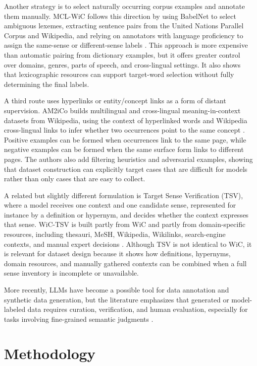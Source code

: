 \documentclass[10pt,a4paper,twocolumn]{article}
\begin{document}
Another strategy is to select naturally occurring corpus examples and annotate them manually. MCL-WiC follows this direction by using BabelNet to select ambiguous lexemes, extracting sentence pairs from the United Nations Parallel Corpus and Wikipedia, and relying on annotators with language proficiency to assign the same-sense or different-sense labels \citep{martelli2021mclwic}. This approach is more expensive than automatic pairing from dictionary examples, but it offers greater control over domains, genres, parts of speech, and cross-lingual settings. It also shows that lexicographic resources can support target-word selection without fully determining the final labels.

A third route uses hyperlinks or entity/concept links as a form of distant supervision. AM2iCo builds multilingual and cross-lingual meaning-in-context datasets from Wikipedia, using the context of hyperlinked words and Wikipedia cross-lingual links to infer whether two occurrences point to the same concept \citep{liu2021am2ico}. Positive examples can be formed when occurrences link to the same page, while negative examples can be formed when the same surface form links to different pages. The authors also add filtering heuristics and adversarial examples, showing that dataset construction can explicitly target cases that are difficult for models rather than only cases that are easy to collect.

A related but slightly different formulation is Target Sense Verification (TSV), where a model receives one context and one candidate sense, represented for instance by a definition or hypernym, and decides whether the context expresses that sense. WiC-TSV is built partly from WiC and partly from domain-specific resources, including thesauri, MeSH, Wikipedia, Wikilinks, search-engine contexts, and manual expert decisions \citep{breit2021wictsv}. Although TSV is not identical to WiC, it is relevant for dataset design because it shows how definitions, hypernyms, domain resources, and manually gathered contexts can be combined when a full sense inventory is incomplete or unavailable.

More recently, LLMs have become a possible tool for data annotation and synthetic data generation, but the literature emphasizes that generated or model-labeled data requires curation, verification, and human evaluation, especially for tasks involving fine-grained semantic judgments \citep{ding2024llmannotation,long2024syntheticdata}.

\section{Methodology}
\label{sec:methodology}
\end{document}
